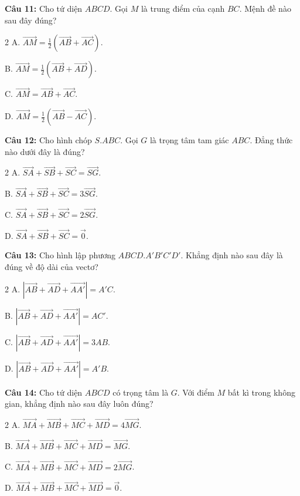 \documentclass[12pt]{article}
\begin{document}
	\vspace{0.2cm}
	\noindent\textbf{Câu 11:} Cho tứ diện $ABCD$. Gọi $M$ là trung điểm của cạnh $BC$. Mệnh đề nào sau đây đúng?
	\begin{multicols}{2}
		A. $\overrightarrow{AM} = \frac{1}{2}(\overrightarrow{AB} + \overrightarrow{AC})$. \par
		B. $\overrightarrow{AM} = \frac{1}{2}(\overrightarrow{AB} + \overrightarrow{AD})$. \par
		C. $\overrightarrow{AM} = \overrightarrow{AB} + \overrightarrow{AC}$. \par
		D. $\overrightarrow{AM} = \frac{1}{2}(\overrightarrow{AB} - \overrightarrow{AC})$.
	\end{multicols}
	
	\vspace{0.2cm}
	\noindent\textbf{Câu 12:} Cho hình chóp $S.ABC$. Gọi $G$ là trọng tâm tam giác $ABC$. Đẳng thức nào dưới đây là đúng?
	\begin{multicols}{2}
		A. $\overrightarrow{SA} + \overrightarrow{SB} + \overrightarrow{SC} = \overrightarrow{SG}$. \par
		B. $\overrightarrow{SA} + \overrightarrow{SB} + \overrightarrow{SC} = 3\overrightarrow{SG}$. \par
		C. $\overrightarrow{SA} + \overrightarrow{SB} + \overrightarrow{SC} = 2\overrightarrow{SG}$. \par
		D. $\overrightarrow{SA} + \overrightarrow{SB} + \overrightarrow{SC} = \vec{0}$.
	\end{multicols}
	
	\vspace{0.2cm}
	\noindent\textbf{Câu 13:} Cho hình lập phương $ABCD.A'B'C'D'$. Khẳng định nào sau đây là đúng về độ dài của vectơ?
	\begin{multicols}{2}
		A. $|\overrightarrow{AB} + \overrightarrow{AD} + \overrightarrow{AA'}| = A'C$. \par
		B. $|\overrightarrow{AB} + \overrightarrow{AD} + \overrightarrow{AA'}| = AC'$. \par
		C. $|\overrightarrow{AB} + \overrightarrow{AD} + \overrightarrow{AA'}| = 3AB$. \par
		D. $|\overrightarrow{AB} + \overrightarrow{AD} + \overrightarrow{AA'}| = A'B$.
	\end{multicols}
	
	\vspace{0.2cm}
	\noindent\textbf{Câu 14:} Cho tứ diện $ABCD$ có trọng tâm là $G$. Với điểm $M$ bất kì trong không gian, khẳng định nào sau đây luôn đúng?
	\begin{multicols}{2}
		A. $\overrightarrow{MA} + \overrightarrow{MB} + \overrightarrow{MC} + \overrightarrow{MD} = 4\overrightarrow{MG}$. \par
		B. $\overrightarrow{MA} + \overrightarrow{MB} + \overrightarrow{MC} + \overrightarrow{MD} = \overrightarrow{MG}$. \par
		C. $\overrightarrow{MA} + \overrightarrow{MB} + \overrightarrow{MC} + \overrightarrow{MD} = 2\overrightarrow{MG}$. \par
		D. $\overrightarrow{MA} + \overrightarrow{MB} + \overrightarrow{MC} + \overrightarrow{MD} = \vec{0}$.
	\end{multicols}
	
\end{document}
